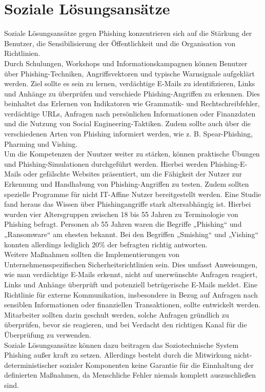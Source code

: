 \documentclass[journal=tosc,final]{iacrtrans}
\begin{document}
\section{Soziale Lösungsansätze}
Soziale Lösungsansätze gegen Phishing konzentrieren sich auf die Stärkung der Benutzer, die Sensibilisierung der Öffentlichkeit und die Organisation von Richtlinien.\\
Durch Schulungen, Workshops und Informationskampagnen können Benutzer über Phishing-Techniken, Angriffsvektoren und typische Warnsignale aufgeklärt werden. Ziel sollte es sein zu lernen, verdächtige E-Mails zu identifizieren, Links und Anhänge zu überprüfen und verschiede Phishing-Angriffen zu erkennen. Dies beinhaltet das Erlernen von Indikatoren wie Grammatik- und Rechtschreibfehler, verdächtige URLs, Anfragen nach persönlichen Informationen oder Finanzdaten und die Nutzung von Social Engineering-Taktiken. Zudem sollte auch über die verschiedenen Arten von Phishing informiert werden, wie z. B. Spear-Phishing, Pharming und Vishing.\\ Um die Kompetenzen der Nuutzer weiter zu stärken, können praktische Übungen und Phishing-Simulationen durchgeführt werden. Hierbei werden  Phishing-E-Mails oder gefälschte Websites präsentiert, um die Fähigkeit der Nutzer zur Erkennung und Handhabung von Phishing-Angriffen zu testen. Zudem sollten spezielle Programme für nicht IT-Affine Nutzer bereitgestellt werden. Eine Studie fand heraus das Wissen über Phishingangriffe stark altersabhängig ist. Hierbei wurden vier Altersgruppen zwischen 18 bis 55 Jahren zu Terminologie von Phishing befragt. Personen ab 55 Jahren waren die Begriffe „Phishing“ und „Ransomware“ am ehesten bekannt. Bei den Begriffen „Smishing“ und „Vishing“ konnten allerdings lediglich 20\% der befragten richtig antworten.\\
Weitere Maßnahmen sollten die Implementierungen von Unternehmensspezifischen Sicherheitsrichtlinien sein. Dies umfasst Anweisungen, wie man verdächtige E-Mails erkennt, nicht auf unerwünschte Anfragen reagiert, Links und Anhänge überprüft und potenziell betrügerische E-Mails meldet. Eine Richtlinie für externe Kommunikation, insbesondere in Bezug auf Anfragen nach sensiblen Informationen oder finanziellen Transaktionen, sollte entwickelt werden. Mitarbeiter sollten darin geschult werden, solche Anfragen gründlich zu überprüfen, bevor sie reagieren, und bei Verdacht den richtigen Kanal für die Überprüfung zu verwenden.\\
Soziale Lösungsansätze können dazu beitragen das Soziotechnische System Phishing außer kraft zu setzen. Allerdings besteht durch die Mitwirkung nicht-deterministischer sozialer Komponenten  keine Garantie für die Einnhaltung der definierten Maßnahmen, da Menschliche Fehler niemals komplett auszuschließen sind.
\end{document}
